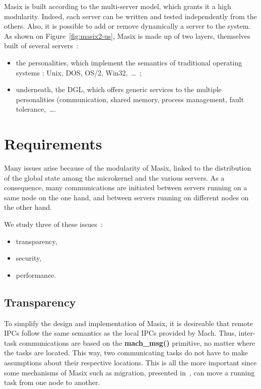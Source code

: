 Masix is built according to the multi-server model, which grants it a high
modularity. Indeed, each server can be written and tested independently from
the others. Also, it is possible to add or remove dynamically a server to
the system.
As shown on Figure~\ref{fig:masix2-us}, Masix is made up of two layers, 
themselves built of several servers~:
\begin{itemize}
\item the personalities, which implement the semantics of traditional
operating systems : Unix, DOS, OS/2, Win32,~\dots~;
\item underneath, the DGL, which offers generic services to the multiple 
personalities (communication, shared memory, process management, fault 
tolerance,~\dots.
\end{itemize}


\section{Requirements}

Many issues arise because of the modularity of Masix,
linked to the distribution of the global state among 
the microkernel and the various servers. As a consequence, many
communications are initiated between servers running on a same node on
the one hand, and between servers running on different nodes on the other hand.

We study three of these issues~:
\begin{itemize}
\item transparency,
\item security,
\item performance.
\end{itemize}

\subsection{Transparency}

To simplify the design and implementation of Masix, it is desireable that
remote IPCs follow the same semantics as the local IPCs provided by Mach.
Thus, inter-task communications are based on the {\bf mach\_msg()} primitive,
no matter where the tasks are located.
This way, two communicating tasks do not have to make assumptions about their 
respective locations. 
This is all the more important since some mechanisms of Masix such as 
migration, presented in~\cite{athens95}, can move a running task from one 
node to another.

